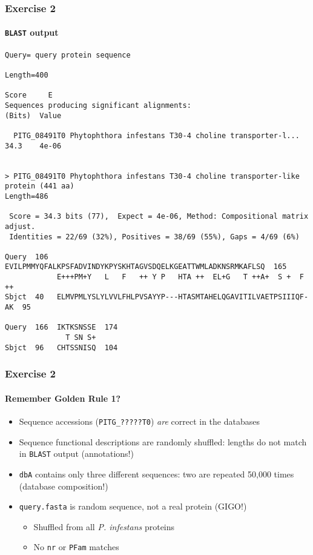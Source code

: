 \begin{frame}[fragile]
  \frametitle{Exercise 2}
  \framesubtitle{\texttt{BLAST} output}
  \begin{tiny}
  \begin{verbatim}
Query= query protein sequence

Length=400
                                                                      Score     E
Sequences producing significant alignments:                          (Bits)  Value

  PITG_08491T0 Phytophthora infestans T30-4 choline transporter-l...  34.3    4e-06


> PITG_08491T0 Phytophthora infestans T30-4 choline transporter-like 
protein (441 aa)
Length=486

 Score = 34.3 bits (77),  Expect = 4e-06, Method: Compositional matrix adjust.
 Identities = 22/69 (32%), Positives = 38/69 (55%), Gaps = 4/69 (6%)

Query  106  EVILPMMYQFALKPSFADVINDYKPYSKHTAGVSDQELKGEATTWMLADKNSRMKAFLSQ  165
            E+++PM+Y   L   F   ++ Y P   HTA ++  EL+G   T ++A+  S +  F ++
Sbjct  40   ELMVPMLYSLYLVVLFHLPVSAYYP---HTASMTAHELQGAVITILVAETPSIIIQF-AK  95

Query  166  IKTKSNSSE  174
              T SN S+
Sbjct  96   CHTSSNISQ  104
  \end{verbatim}   
  \end{tiny} 
\end{frame}

\begin{frame}
  \frametitle{Exercise 2}
  \framesubtitle{Remember Golden Rule 1?}    
  \begin{itemize}
    \item<1-> Sequence accessions (\texttt{PITG\_?????T0}) \emph{are} correct in the databases
    \item<2-> Sequence functional descriptions are randomly shuffled: lengths do not match in \texttt{BLAST} output (annotations!)
    \item<3-> \texttt{dbA} contains only three different sequences: two are repeated 50,000 times (database composition!)
    \item<4-> \texttt{query.fasta} is random sequence, not a real protein (GIGO!)
    \begin{itemize}
      \item<4-> Shuffled from all \textit{P. infestans} proteins
      \item<4-> No \texttt{nr} or \texttt{PFam} matches        
    \end{itemize}
  \end{itemize}
\end{frame}

